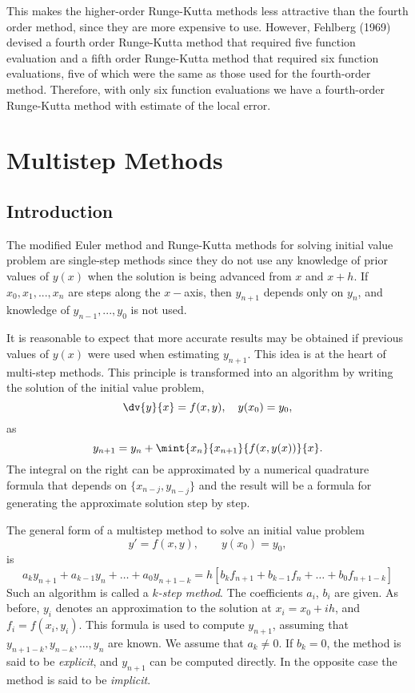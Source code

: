 \noindent
This makes the higher-order Runge-Kutta methods less attractive than
the fourth order method, since they are more expensive to use.
However, Fehlberg (1969) devised a fourth order Runge-Kutta method
that required five function evaluation and a fifth order Runge-Kutta
method that required six function evaluations, five of which were the
same as those used for the fourth-order method.  Therefore, with only
six function evaluations we have a fourth-order Runge-Kutta method
with estimate of the local error.

\section{Multistep Methods}

\subsection{Introduction}

The modified Euler method and Runge-Kutta methods for solving initial
value problem are single-step methods since they do not use any
knowledge of prior values of $y(x)$ when the solution is being
advanced from $x$ and $x+h$. If $x_0,x_1,...,x_n$ are steps along the
$x-$axis, then $y_{n+1}$ depends only on $y_n$, and knowledge of
$y_{n-1},...,y_0$ is not used.

It is reasonable to expect that more accurate results may be obtained
if previous values of $y(x)$ were used when estimating $y_{n+1}$.
This idea is at the heart of multi-step methods.  This principle is
transformed into an algorithm by writing the solution of the initial
value problem,
%
\begin{equation}
  \dv{y}{x} = f(x,y), \quad y(x_0)=y_0,
  \label{IVP.eq:25}
\end{equation}
%
as
%
\begin{equation}
  y_{n+1} = y_n + \mint{x_n}{x_{n+1}}{f(x,y(x))}{x}.
  \label{IVP.eq:24}
\end{equation}
%
The integral on the right can be approximated by a numerical
quadrature formula that depends on $\{ x_{n-j}, y_{n-j} \}$ and the
result will be a formula for generating the approximate solution step
by step.

The general form of a multistep method to solve an initial value problem
%
\begin{equation}
  y' = f(x,y), \qquad y(x_0) = y_0 ,
  \label{IVP.eq:44}
\end{equation}
%
is 
%
\begin{equation}
  a_k y_{n+1} + a_{k-1} y_{n} + \ldots  + a_0 y_{n+1-k} = 
  h [ b_k f_{n+1} + b_{k-1} f_{n} + \ldots + b_0 f_{n+1-k}]
  \label{IVP.eq:45}
\end{equation}
%
Such an algorithm is called a \textit{$k$-step method}. The
coefficients $a_i$, $b_i$ are given. As before, $y_i$ denotes an
approximation to the solution at $x_i=x_0+ih$, and
$f_i=f(x_i,y_i)$. This formula is used to compute $y_{n+1}$, assuming
that $y_{n+1-k},y_{n-k},...,y_{n}$ are known. We assume that $a_k\ne
0$. If $b_k=0$, the method is said to be \textit{explicit}, and
$y_{n+1}$ can be computed directly. In the opposite case the method is
said to be \textit{implicit}.

